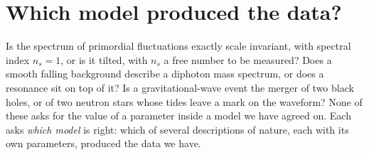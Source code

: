 \providecommand{\FiveCNsRef}{}\renewcommand{\FiveCNsRef}{2.096}
\providecommand{\FiveCNsIter}{}\renewcommand{\FiveCNsIter}{1211}
\providecommand{\FiveCNsEval}{}\renewcommand{\FiveCNsEval}{90450449}
\providecommand{\FiveCNsEvalM}{}\renewcommand{\FiveCNsEvalM}{90.45}
\providecommand{\FiveCNsTime}{}\renewcommand{\FiveCNsTime}{51.58}
\providecommand{\FiveCNsLive}{}\renewcommand{\FiveCNsLive}{100}
\providecommand{\FiveCNsRuns}{}\renewcommand{\FiveCNsRuns}{8}
\providecommand{\FiveCNsH}{}\renewcommand{\FiveCNsH}{3.982}
\providecommand{\FiveCNsSkilling}{}\renewcommand{\FiveCNsSkilling}{0.1996}
\providecommand{\FiveCNsRunSd}{}\renewcommand{\FiveCNsRunSd}{0.2064}
\providecommand{\FiveCNsRunMean}{}\renewcommand{\FiveCNsRunMean}{2.083}
\providecommand{\FiveCNsLnXend}{}\renewcommand{\FiveCNsLnXend}{-12.11}
\providecommand{\FiveCCntZzero}{}\renewcommand{\FiveCCntZzero}{0.03609}
\providecommand{\FiveCCntZone}{}\renewcommand{\FiveCCntZone}{0.09631}
\providecommand{\FiveCCntZoneQuad}{}\renewcommand{\FiveCCntZoneQuad}{0.09631}
\providecommand{\FiveCCntB}{}\renewcommand{\FiveCCntB}{2.669}
\providecommand{\FiveCCntLhat}{}\renewcommand{\FiveCCntLhat}{0.1755}
\providecommand{\FiveCCntLR}{}\renewcommand{\FiveCCntLR}{4.862}
\providecommand{\FiveCCntOcc}{}\renewcommand{\FiveCCntOcc}{0.5489}
\providecommand{\FiveCCntCdfb}{}\renewcommand{\FiveCCntCdfb}{0.9834}
\providecommand{\FiveCCntCdfbs}{}\renewcommand{\FiveCCntCdfbs}{0.02034}
\providecommand{\FiveCCntZoneWide}{}\renewcommand{\FiveCCntZoneWide}{0.009834}
\providecommand{\FiveCCntBWide}{}\renewcommand{\FiveCCntBWide}{0.2725}
\providecommand{\FiveCCntPost}{}\renewcommand{\FiveCCntPost}{0.7274}
 
\section{Which model produced the data?}
\label{5c:sec:models}

Is the spectrum of primordial fluctuations exactly scale invariant, with spectral
index $n_s=1$, or is it tilted, with $n_s$ a free number to be measured? Does a
smooth falling background describe a diphoton mass spectrum, or does a resonance
sit on top of it? Is a gravitational-wave event the merger of two black holes, or
of two neutron stars whose tides leave a mark on the waveform? None of these asks
for the value of a parameter inside a model we have agreed on. Each asks
\emph{which model} is right: which of several descriptions of nature, each with its
own parameters, produced the data we have.

